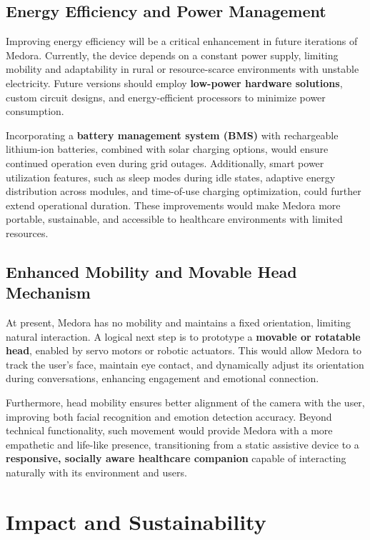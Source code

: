 \subsection{Energy Efficiency and Power Management}
Improving energy efficiency will be a critical enhancement in future iterations of Medora. Currently, 
the device depends on a constant power supply, limiting mobility and adaptability in rural or 
resource-scarce environments with unstable electricity. Future versions should employ 
\textbf{low-power hardware solutions}, custom circuit designs, and energy-efficient processors to 
minimize power consumption. 

Incorporating a \textbf{battery management system (BMS)} with rechargeable lithium-ion batteries, 
combined with solar charging options, would ensure continued operation even during grid 
outages. Additionally, smart power utilization features, such as sleep modes during idle states, 
adaptive energy distribution across modules, and time-of-use charging optimization, could further 
extend operational duration. These improvements would make Medora more portable, sustainable, 
and accessible to healthcare environments with limited resources.

\subsection{Enhanced Mobility and Movable Head Mechanism}
At present, Medora has no mobility and maintains a fixed orientation, limiting natural interaction. 
A logical next step is to prototype a \textbf{movable or rotatable head}, enabled by servo motors or 
robotic actuators. This would allow Medora to track the user’s face, maintain eye contact, and 
dynamically adjust its orientation during conversations, enhancing engagement and emotional 
connection. 

Furthermore, head mobility ensures better alignment of the camera with the user, improving both 
facial recognition and emotion detection accuracy. Beyond technical functionality, such movement 
would provide Medora with a more empathetic and life-like presence, transitioning from a static 
assistive device to a \textbf{responsive, socially aware healthcare companion} capable of interacting 
naturally with its environment and users.



\section{ Impact and Sustainability}

